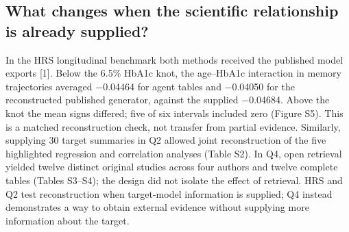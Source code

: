 \documentclass[11pt,letterpaper]{article}
\begin{document}
\subsection{What changes when the scientific relationship is already supplied?}

In the HRS longitudinal benchmark both methods received the published model exports [1]. Below the 6.5\% HbA1c knot, the age–\allowbreak{}HbA1c interaction in memory trajectories averaged −0.04464 for agent tables and −0.04050 for the reconstructed published generator, against the supplied −0.04684. Above the knot the mean signs differed; five of six intervals included zero (Figure S5). This is a matched reconstruction check, not transfer from partial evidence. Similarly, supplying 30 target summaries in Q2 allowed joint reconstruction of the five highlighted regression and correlation analyses (Table S2). In Q4, open retrieval yielded twelve distinct original studies across four authors and twelve complete tables (Tables S3–\allowbreak{}S4); the design did not isolate the effect of retrieval. HRS and Q2 test reconstruction when target-model information is supplied; Q4 instead demonstrates a way to obtain external evidence without supplying more information about the target.


\FloatBarrier

\begingroup

\small

\renewcommand{\arraystretch}{1.22}
\end{document}
